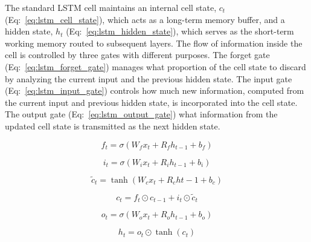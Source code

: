 \noindent The standard LSTM cell maintains an internal cell state, $c_t$(Eq:~\ref{eq:lstm_cell_state}), which acts as a long-term memory buffer, 
and a hidden state, $h_t$ (Eq:~\ref{eq:lstm_hidden_state}), 
which serves as the short-term working memory routed to subsequent layers. The flow of information inside the cell is controlled by 
three gates with different purposes. The forget gate (Eq:~\ref{eq:lstm_forget_gate}) manages what proportion of the cell state to discard by analyzing the 
current input and the previous hidden state. The input gate (Eq:~\ref{eq:lstm_input_gate}) controls how much new information, computed from the current input and 
previous hidden state, is incorporated into the cell state. The output gate (Eq:~\ref{eq:lstm_output_gate}) what information from the
updated cell state is transmitted as the next hidden state.

\begin{equation}
f_t = \sigma(W_f x_t + R_f h_{t-1} + b_f)
\label{eq:lstm_forget_gate}
\end{equation}

\begin{equation}
i_t = \sigma(W_i x_t + R_i h_{t-1} + b_i)
\label{eq:lstm_input_gate}
\end{equation}

\begin{equation}
\tilde{c}_t = \tanh(W_c x_t + R_c h{t-1} + b_c)
\label{eq:lstm_candidate_state}
\end{equation}

\begin{equation}
c_t = f_t \odot c_{t-1} + i_t \odot \tilde{c}_t
\label{eq:lstm_cell_state}
\end{equation}

\begin{equation}
o_t = \sigma(W_o x_t + R_o h_{t-1} + b_o)
\label{eq:lstm_output_gate}
\end{equation}

\begin{equation}
h_t = o_t \odot \tanh(c_t)
\label{eq:lstm_hidden_state}
\end{equation}

